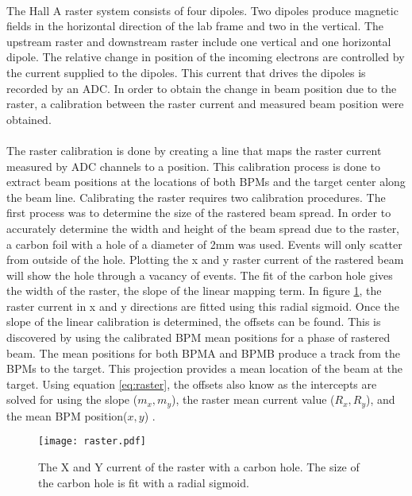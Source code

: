 	 
	 \paragraph{} The Hall A raster system consists of four dipoles. Two dipoles produce magnetic fields in the horizontal direction of the lab frame and two in the vertical. The upstream raster and downstream raster include one vertical and one horizontal dipole. The relative change in position of the incoming electrons are controlled by the current supplied to the dipoles. This current that drives the dipoles is recorded by an ADC. In order to obtain the change in beam position due to the raster, a calibration between the raster current and measured beam position were obtained.  

	 \paragraph{}
	 The raster calibration is done by creating a line that maps the raster current measured by ADC channels to a position. This calibration process is done to extract beam positions at the locations of both BPMs and the target center along the beam line. Calibrating the raster requires two calibration procedures. The first process was to determine the size of the rastered beam spread. In order to accurately determine the width and height of the beam spread due to the raster, a carbon foil with a hole of a diameter of 2mm was used. Events will only scatter from outside of the hole. Plotting the x and y raster current of the rastered beam will show the hole through a vacancy of events. The fit of the carbon hole gives the width of the raster, the slope of the linear mapping term. In figure \ref{fig:raster}, the raster current in x and y directions are fitted using this radial sigmoid. Once the slope of the linear calibration is determined, the offsets can be found. This is discovered by using the calibrated BPM mean positions for a phase of rastered beam. The mean positions for both BPMA and BPMB produce a track from the BPMs to the target. This projection provides a mean location of the beam at the target.  Using equation \ref{eq:raster}, the offsets also know as the intercepts are solved for using the slope ($m_x,m_y$), the raster mean current value ($R_x,R_y$), and the mean BPM position($x,y$) \cite{Trast}.
	 	 
	 \begin{figure}[t]
	 	\centering
	 	\texttt{[image: raster.pdf]} 
	 	\caption{The X and Y current of the raster with a carbon hole. The size of the carbon hole is fit with a radial sigmoid\cite{Trast}.}
	 	\label{fig:raster}
	 \end{figure} 
	 
